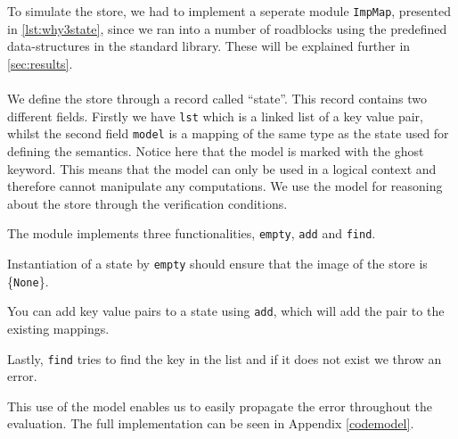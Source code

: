 To simulate the store, we had to implement a seperate module \texttt{ImpMap}, presented in \autoref{lst:why3state},
since we ran into a number of roadblocks using the predefined data-structures in the standard library.
These will be explained further in \ref{sec:results}.
\\~\\
We define the store through a record called ``state''.
This record contains two different fields.
Firstly we have \texttt{lst} which is a linked list of a key value pair,
whilst the second field \texttt{model} is a mapping of the same type as the state used for defining the semantics.
Notice here that the model is marked with the ghost keyword. This means that the model can only be used in a logical context
and therefore cannot manipulate any computations.
We use the model for reasoning about the store through the verification conditions.

The module implements three functionalities, \texttt{empty}, \texttt{add} and \texttt{find}.

Instantiation of a state by \texttt{empty} should ensure that the image of the store is \{\texttt{None}\}.

You can add key value pairs to a state using \texttt{add}, which will add the pair to the existing mappings.

Lastly, \texttt{find} tries to find the key in the list and if it does not exist we throw an error.

This use of the model enables us to easily propagate the error throughout the evaluation.
The full implementation can be seen in Appendix \ref{codemodel}.







